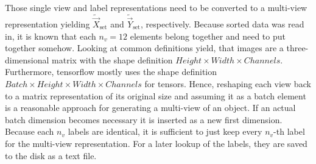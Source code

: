 Those single view and label representations need to be converted to a multi-view representation yielding $\tilde{\vec{X}}_{\text{set}}$ and $\tilde{\vec{Y}}_{\text{set}}$, respectively.
Because sorted data was read in, it is known that each $n_v=12$ elements belong together and need to put together somehow.
Looking at common definitions yield, that images are a three-dimensional matrix with the shape definition $Height \times Width \times Channels$.
Furthermore, tensorflow mostly uses the shape definition $Batch \times Height \times Width \times Channels$ for tensors.
Hence, reshaping each view back to a matrix representation of its original size and assuming it as a batch element is a reasonable approach for generating a multi-view of an object.
If an actual batch dimension becomes necessary it is inserted as a new first dimension.
Because each $n_v$ labels are identical, it is sufficient to just keep every $n_v$-th label for the multi-view representation.
For a later lookup of the labels, they are saved to the disk as a text file.